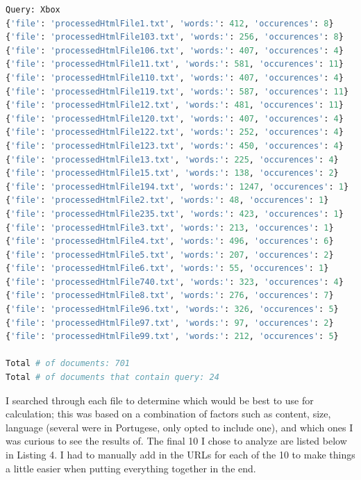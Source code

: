\documentclass[12pt]{article}
\begin{document}
\begin{lstlisting}[language=Python, caption={QueryResults.txt}, label=lst:copy]
Query: Xbox
{'file': 'processedHtmlFile1.txt', 'words:': 412, 'occurences': 8}
{'file': 'processedHtmlFile103.txt', 'words:': 256, 'occurences': 8}
{'file': 'processedHtmlFile106.txt', 'words:': 407, 'occurences': 4}
{'file': 'processedHtmlFile11.txt', 'words:': 581, 'occurences': 11}
{'file': 'processedHtmlFile110.txt', 'words:': 407, 'occurences': 4}
{'file': 'processedHtmlFile119.txt', 'words:': 587, 'occurences': 11}
{'file': 'processedHtmlFile12.txt', 'words:': 481, 'occurences': 11}
{'file': 'processedHtmlFile120.txt', 'words:': 407, 'occurences': 4}
{'file': 'processedHtmlFile122.txt', 'words:': 252, 'occurences': 4}
{'file': 'processedHtmlFile123.txt', 'words:': 450, 'occurences': 4}
{'file': 'processedHtmlFile13.txt', 'words:': 225, 'occurences': 4}
{'file': 'processedHtmlFile15.txt', 'words:': 138, 'occurences': 2}
{'file': 'processedHtmlFile194.txt', 'words:': 1247, 'occurences': 1}
{'file': 'processedHtmlFile2.txt', 'words:': 48, 'occurences': 1}
{'file': 'processedHtmlFile235.txt', 'words:': 423, 'occurences': 1}
{'file': 'processedHtmlFile3.txt', 'words:': 213, 'occurences': 1}
{'file': 'processedHtmlFile4.txt', 'words:': 496, 'occurences': 6}
{'file': 'processedHtmlFile5.txt', 'words:': 207, 'occurences': 2}
{'file': 'processedHtmlFile6.txt', 'words:': 55, 'occurences': 1}
{'file': 'processedHtmlFile740.txt', 'words:': 323, 'occurences': 4}
{'file': 'processedHtmlFile8.txt', 'words:': 276, 'occurences': 7}
{'file': 'processedHtmlFile96.txt', 'words:': 326, 'occurences': 5}
{'file': 'processedHtmlFile97.txt', 'words:': 97, 'occurences': 2}
{'file': 'processedHtmlFile99.txt', 'words:': 212, 'occurences': 5}

Total # of documents: 701
Total # of documents that contain query: 24
\end{lstlisting}

I searched through each file to determine which would be best to use for calculation; this was based on a combination of factors such as content, size, language (several were in Portugese, only opted to include one), and which ones I was curious to see the results of. The final 10 I chose to analyze are listed below in Listing 4. I had to manually add in the URLs for each of the 10 to make things a little easier when putting everything together in the end.
\end{document}
